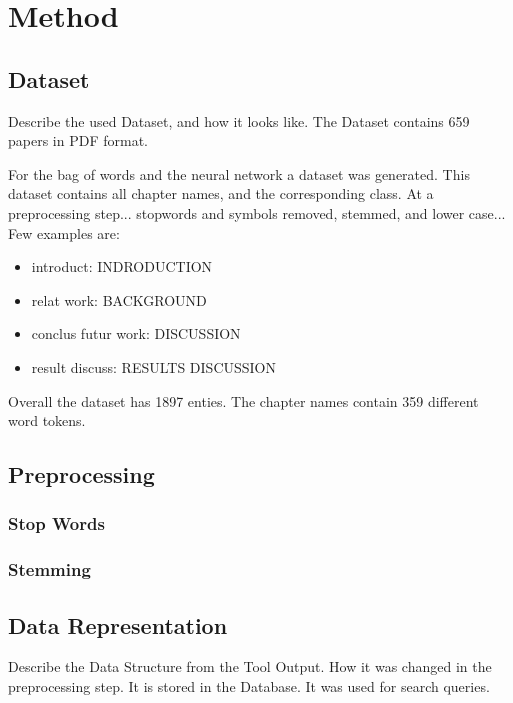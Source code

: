 \chapter{Method}
\label{cha:method}

\section{Dataset}
\label{sec:dataset}

Describe the used Dataset, and how it looks like.
The Dataset contains 659 papers in PDF format.

For the bag of words and the neural network a dataset was generated. This dataset contains all chapter names, and the corresponding class. 
At a preprocessing step... stopwords and symbols removed, stemmed, and lower case... Few examples are:

\begin{itemize}[label={}]
  \item introduct: INDRODUCTION
  \item relat work: BACKGROUND
  \item conclus futur work: DISCUSSION
  \item result discuss: RESULTS DISCUSSION
\end{itemize}

Overall the dataset has 1897 enties. The chapter names contain 359 different word tokens.

\section{Preprocessing}
\label{sec:preprocessing}

\subsection{Stop Words}
\label{subsec:stop-words}

\subsection{Stemming}
\label{subsec:stemming}

\section{Data Representation}
\label{sec:data-representation}

Describe the Data Structure from the Tool Output. How it was changed in the preprocessing step. It is stored in the Database. It was used for search queries.  

